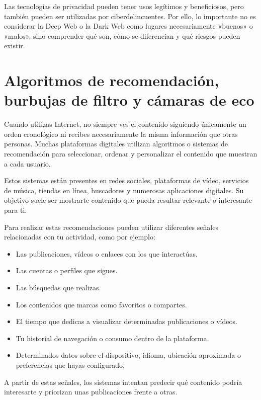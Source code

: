 \documentclass[
  spanish,
  a4paper,
  openany]{book}
\begin{document}
Las tecnologías de privacidad pueden tener usos legítimos y beneficiosos, pero también pueden ser utilizadas por ciberdelincuentes. Por ello, lo importante no es considerar la Deep Web o la Dark Web como lugares necesariamente «buenos» o «malos», sino comprender qué son, cómo se diferencian y qué riesgos pueden existir.

\section{Algoritmos de recomendación, burbujas de filtro y cámaras de eco}\label{algoritmos-de-recomendaciuxf3n-burbujas-de-filtro-y-cuxe1maras-de-eco}

Cuando utilizas Internet, no siempre ves el contenido siguiendo únicamente un orden cronológico ni recibes necesariamente la misma información que otras personas. Muchas plataformas digitales utilizan algoritmos o sistemas de recomendación para seleccionar, ordenar y personalizar el contenido que muestran a cada usuario.

Estos sistemas están presentes en redes sociales, plataformas de vídeo, servicios de música, tiendas en línea, buscadores y numerosas aplicaciones digitales. Su objetivo suele ser mostrarte contenido que pueda resultar relevante o interesante para ti.

Para realizar estas recomendaciones pueden utilizar diferentes señales relacionadas con tu actividad, como por ejemplo:

\begin{itemize}
\item
  Las publicaciones, vídeos o enlaces con los que interactúas.
\item
  Las cuentas o perfiles que sigues.
\item
  Las búsquedas que realizas.
\item
  Los contenidos que marcas como favoritos o compartes.
\item
  El tiempo que dedicas a visualizar determinadas publicaciones o vídeos.
\item
  Tu historial de navegación o consumo dentro de la plataforma.
\item
  Determinados datos sobre el dispositivo, idioma, ubicación aproximada o preferencias que hayas configurado.
\end{itemize}

A partir de estas señales, los sistemas intentan predecir qué contenido podría interesarte y priorizan unas publicaciones frente a otras.
\end{document}
